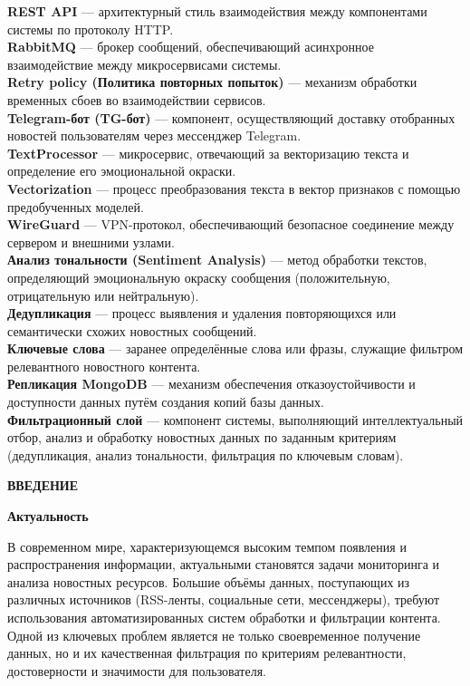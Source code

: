 \textbf{REST API} — архитектурный стиль взаимодействия между компонентами системы по протоколу HTTP.\\
\textbf{RabbitMQ} — брокер сообщений, обеспечивающий асинхронное взаимодействие между микросервисами системы.\\
\textbf{Retry policy (Политика повторных попыток)} — механизм обработки временных сбоев во взаимодействии сервисов.\\
\textbf{Telegram-бот (TG-бот)} — компонент, осуществляющий доставку отобранных новостей пользователям через мессенджер Telegram.\\
\textbf{TextProcessor} — микросервис, отвечающий за векторизацию текста и определение его эмоциональной окраски.\\
\textbf{Vectorization} — процесс преобразования текста в вектор признаков с помощью предобученных моделей.\\
\textbf{WireGuard} — VPN-протокол, обеспечивающий безопасное соединение между сервером и внешними узлами.\\
\textbf{Анализ тональности (Sentiment Analysis)} — метод обработки текстов, определяющий эмоциональную окраску сообщения (положительную, отрицательную или нейтральную).\\
\textbf{Дедупликация} — процесс выявления и удаления повторяющихся или семантически схожих новостных сообщений.\\
\textbf{Ключевые слова} — заранее определённые слова или фразы, служащие фильтром релевантного новостного контента.\\
\textbf{Репликация MongoDB} — механизм обеспечения отказоустойчивости и доступности данных путём создания копий базы данных.\\
\textbf{Фильтрационный слой} — компонент системы, выполняющий интеллектуальный отбор, анализ и обработку новостных данных по заданным критериям (дедупликация, анализ тональности, фильтрация по ключевым словам).

\newpage
{\centering
\normal
\textbf{ВВЕДЕНИЕ}\par
}

\textbf{Актуальность}

В современном мире, характеризующемся высоким темпом появления и распространения информации, актуальными становятся задачи мониторинга и анализа новостных ресурсов.
Большие объёмы данных, поступающих из различных источников (RSS-ленты, социальные сети, мессенджеры), требуют использования автоматизированных систем обработки и фильтрации контента.
Одной из ключевых проблем является не только своевременное получение данных, но и их качественная фильтрация по критериям релевантности, достоверности и значимости для пользователя.

